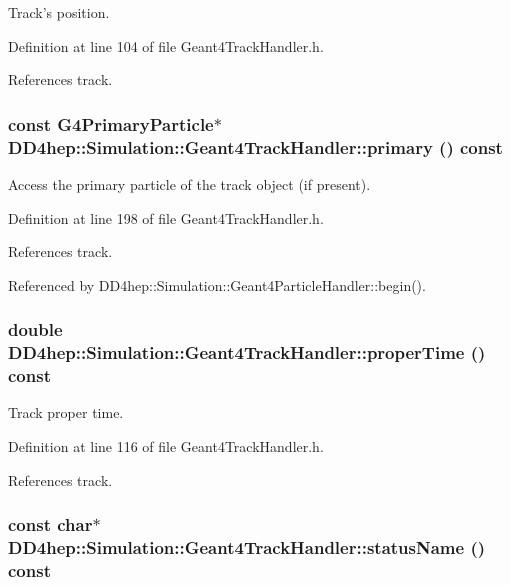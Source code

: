 Track's position. 

Definition at line 104 of file Geant4TrackHandler.h.

References track.\hypertarget{class_d_d4hep_1_1_simulation_1_1_geant4_track_handler_a62a4f0316aff9faca83efe0f86e35793}{
\subsubsection[{primary}]{\setlength{\rightskip}{0pt plus 5cm}const G4PrimaryParticle$\ast$ DD4hep::Simulation::Geant4TrackHandler::primary () const}}
\label{class_d_d4hep_1_1_simulation_1_1_geant4_track_handler_a62a4f0316aff9faca83efe0f86e35793}


Access the primary particle of the track object (if present). 

Definition at line 198 of file Geant4TrackHandler.h.

References track.

Referenced by DD4hep::Simulation::Geant4ParticleHandler::begin().\hypertarget{class_d_d4hep_1_1_simulation_1_1_geant4_track_handler_a13a89fbc1343bbb75d0a77386f8cfc65}{
\subsubsection[{properTime}]{\setlength{\rightskip}{0pt plus 5cm}double DD4hep::Simulation::Geant4TrackHandler::properTime () const}}
\label{class_d_d4hep_1_1_simulation_1_1_geant4_track_handler_a13a89fbc1343bbb75d0a77386f8cfc65}


Track proper time. 

Definition at line 116 of file Geant4TrackHandler.h.

References track.\hypertarget{class_d_d4hep_1_1_simulation_1_1_geant4_track_handler_ad3d5910f752a3d4c0c97e1ef9fd3f4d2}{
\subsubsection[{statusName}]{\setlength{\rightskip}{0pt plus 5cm}const char$\ast$ DD4hep::Simulation::Geant4TrackHandler::statusName () const}}
\label{class_d_d4hep_1_1_simulation_1_1_geant4_track_handler_ad3d5910f752a3d4c0c97e1ef9fd3f4d2}



